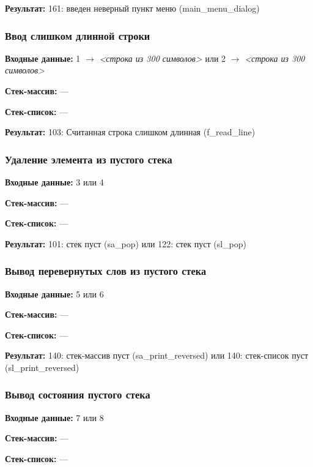 \documentclass[a4paper,12pt]{extarticle}
\begin{document}
\textbf{Результат: }
161: введен неверный пункт меню (main\_menu\_dialog)


\subsubsection{Ввод слишком длинной строки}

\textbf{Входные данные: }
1 $\rightarrow$ \textit{<строка из 300 символов>} или 2 $\rightarrow$ \textit{<строка из 300 символов>}

\textbf{Стек-массив: }
---

\textbf{Стек-список: }
---

\textbf{Результат: }
103: Считанная строка слишком длинная (f\_read\_line)


\subsubsection{Удаление элемента из пустого стека}

\textbf{Входные данные: }
3 или 4

\textbf{Стек-массив: }
---

\textbf{Стек-список: }
---

\textbf{Результат: }
101: стек пуст (sa\_pop) или 122: стек пуст (sl\_pop)


\subsubsection{Вывод перевернутых слов из пустого стека}

\textbf{Входные данные: }
5 или 6

\textbf{Стек-массив: }
---

\textbf{Стек-список: }
---

\textbf{Результат: }
140: стек-массив пуст (sa\_print\_reversed) или 140: стек-список пуст (sl\_print\_reversed)


\subsubsection{Вывод состояния пустого стека}

\textbf{Входные данные: }
7 или 8

\textbf{Стек-массив: }
---

\textbf{Стек-список: }
---
\end{document}

